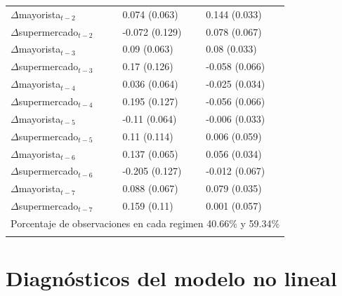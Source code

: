\begin{table}[H]
\begin{tabular}{@{}lll@{}}
$\Delta$mayorista$_{t-2}$ & 0.074 (0.063) & 0.144 (0.033) \\
$\Delta$supermercado$_{t-2}$ & -0.072 (0.129) & 0.078 (0.067) \\
$\Delta$mayorista$_{t-3}$ & 0.09 (0.063) & 0.08 (0.033) \\
$\Delta$supermercado$_{t-3}$ & 0.17 (0.126) & -0.058 (0.066) \\
$\Delta$mayorista$_{t-4}$ & 0.036 (0.064) & -0.025 (0.034) \\
$\Delta$supermercado$_{t-4}$ & 0.195 (0.127) & -0.056 (0.066) \\
$\Delta$mayorista$_{t-5}$ & -0.11 (0.064) & -0.006 (0.033) \\
$\Delta$supermercado$_{t-5}$ & 0.11 (0.114) & 0.006 (0.059) \\
$\Delta$mayorista$_{t-6}$ & 0.137 (0.065) & 0.056 (0.034) \\
$\Delta$supermercado$_{t-6}$ & -0.205 (0.127) & -0.012 (0.067) \\
$\Delta$mayorista$_{t-7}$ & 0.088 (0.067) & 0.079 (0.035) \\
$\Delta$supermercado$_{t-7}$ & 0.159 (0.11) & 0.001 (0.057) \\
\midrule 
\multicolumn{3}{c}{Porcentaje de observaciones en cada regimen 40.66\% y 59.34\%}  \\
 \bottomrule \\ 
\bottomrule
\end{tabular}
\end{table}


\section{Diagnósticos del modelo no lineal}








